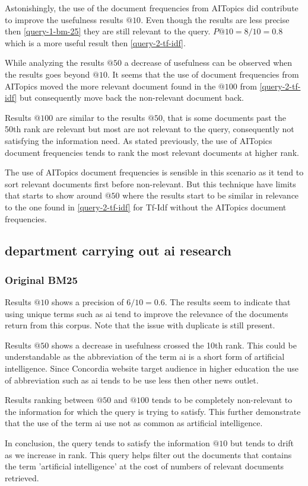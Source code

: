 \par Astonishingly, the use of the document frequencies from AITopics did contribute to improve the usefulness results $@10$. Even though the results are less precise then \ref{query-1-bm-25} they are still relevant to the query. $P@10=8/10=0.8$ which is a more useful result then \ref{query-2-tf-idf}.
\par While analyzing the results $@50$ a decrease of usefulness can be observed when the results goes beyond $@10$. It seems that the use of document frequencies from AITopics moved the more relevant document found in the $@100$ from \ref{query-2-tf-idf} but consequently move back the non-relevant document back.
\par Results $@100$ are similar to the results $@50$, that is some documents past the 50th rank are relevant but most are not relevant to the query, consequently not satisfying the information need. As stated previously, the use of AITopics document frequencies tends to rank the most relevant documents at higher rank.
\par The use of AITopics document frequencies is sensible in this scenario as it tend to sort relevant documents first before non-relevant. But this technique have limits that starts to show around $@50$ where the results start to be similar in relevance to the one found in \ref{query-2-tf-idf} for Tf-Idf without the AITopics document frequencies.

\subsection{department carrying out ai research}\label{query-3}

\subsubsection{Original BM25}\label{query-3-bm25}

\par Results $@10$ shows a precision of $6/10=0.6$. The results seem to indicate that using unique terms such as ai tend to improve the relevance of the documents return from this corpus. Note that the issue with duplicate is still present.
\par Results $@50$ shows a decrease in usefulness crossed the 10th rank. This could be understandable as the abbreviation of the term ai is a short form of artificial intelligence. Since Concordia website target audience in higher education the use of abbreviation such as ai tends to be use less then other news outlet.
\par Results ranking between $@50$ and $@100$ tends to be completely non-relevant to the information for which the query is trying to satisfy. This further demonstrate that the use of the term ai use not as common as artificial intelligence. 
\par In conclusion, the query tends to satisfy the information $@10$ but tends to drift as we increase in rank. This query helps filter out the documents that contains the term 'artificial intelligence' at the cost of numbers of relevant documents retrieved.

